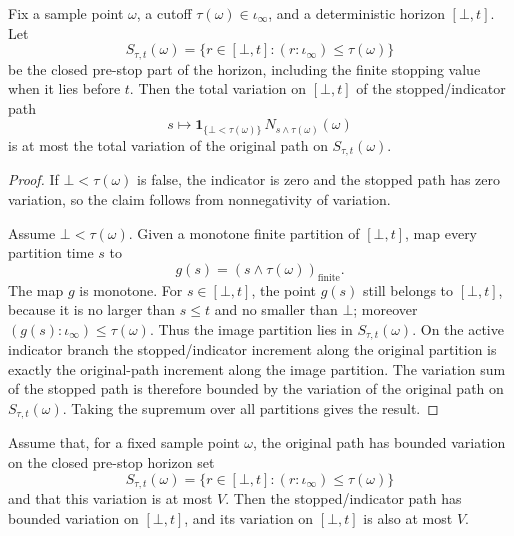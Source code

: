 \begin{lemma}\label{lem:eVariationOn_stoppedProcess_indicator_le_closed_pre_stop_Icc}
Fix a sample point \(\omega\), a cutoff \(\tau(\omega)\in\iota_\infty\),
and a deterministic horizon \([\bot,t]\).  Let
\[
  S_{\tau,t}(\omega)
  =
  \{r\in[\bot,t] : (r:\iota_\infty)\le \tau(\omega)\}
\]
be the closed pre-stop part of the horizon, including the finite stopping
value when it lies before \(t\).  Then the total variation on \([\bot,t]\)
of the stopped/indicator path
\[
  s\longmapsto
  \mathbf 1_{\{\bot<\tau(\omega)\}}\,
  N_{s\wedge\tau(\omega)}(\omega)
\]
is at most the total variation of the original path on
\(S_{\tau,t}(\omega)\).
\end{lemma}

\begin{proof}
If \(\bot<\tau(\omega)\) is false, the indicator is zero and the stopped path
has zero variation, so the claim follows from nonnegativity of variation.

Assume \(\bot<\tau(\omega)\).  Given a monotone finite partition of
\([\bot,t]\), map every partition time \(s\) to
\[
  g(s)=(s\wedge\tau(\omega))_{\mathrm{finite}}.
\]
The map \(g\) is monotone.  For \(s\in[\bot,t]\), the point \(g(s)\) still
belongs to \([\bot,t]\), because it is no larger than \(s\le t\) and no
smaller than \(\bot\); moreover \((g(s):\iota_\infty)\le\tau(\omega)\).
Thus the image partition lies in \(S_{\tau,t}(\omega)\).  On the active
indicator branch the stopped/indicator increment along the original
partition is exactly the original-path increment along the image partition.
The variation sum of the stopped path is therefore bounded by the variation
of the original path on \(S_{\tau,t}(\omega)\).  Taking the supremum over all
partitions gives the result.
\end{proof}

\begin{lemma}\label{lem:stoppedProcess_indicator_variation_bound_on_Icc_of_closed_pre_stop_bound}
Assume that, for a fixed sample point \(\omega\), the original path has
bounded variation on the closed pre-stop horizon set
\[
  S_{\tau,t}(\omega)
  =
  \{r\in[\bot,t] : (r:\iota_\infty)\le \tau(\omega)\}
\]
and that this variation is at most \(V\).  Then the stopped/indicator path
has bounded variation on \([\bot,t]\), and its variation on \([\bot,t]\) is
also at most \(V\).
\end{lemma}

